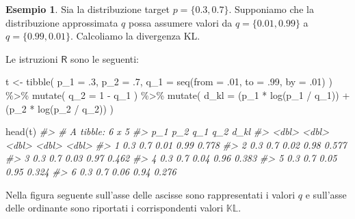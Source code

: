 \documentclass[
  11pt,
]{krantz}
\makeatletter
\newenvironment{Shaded}{\begin{snugshade}}{\end{snugshade}}
\newcommand{\AttributeTok}[1]{\textcolor[rgb]{0.61,0.61,0.61}{#1}}
\newcommand{\CommentTok}[1]{\textcolor[rgb]{0.37,0.37,0.37}{\textit{#1}}}
\newcommand{\DecValTok}[1]{\textcolor[rgb]{0.06,0.06,0.06}{#1}}
\newcommand{\FunctionTok}[1]{\textcolor[rgb]{0,0,0}{#1}}
\newcommand{\NormalTok}[1]{#1}
\newcommand{\OtherTok}[1]{\textcolor[rgb]{0.37,0.37,0.37}{#1}}
\newcommand{\SpecialCharTok}[1]{\textcolor[rgb]{0,0,0}{#1}}
\newenvironment{kframe}{%
\medskip{}
\setlength{\fboxsep}{.8em}
 \def\at@end@of@kframe{}%
 \ifinner\ifhmode%
  \def\at@end@of@kframe{\end{minipage}}%
  \begin{minipage}{\columnwidth}%
 \fi\fi%
 \def\FrameCommand##1{\hskip\@totalleftmargin \hskip-\fboxsep
 \colorbox{shadecolor}{##1}\hskip-\fboxsep
     \hskip-\linewidth \hskip-\@totalleftmargin \hskip\columnwidth}%
 \MakeFramed {\advance\hsize-\width
   \@totalleftmargin\z@ \linewidth\hsize
   \@setminipage}}%
 {\par\unskip\endMakeFramed%
 \at@end@of@kframe}
\renewenvironment{Shaded}{\begin{kframe}}{\end{kframe}}
\newcommand{\R}{\textsf{R}} %
\theoremstyle{definition}
\theoremstyle{definition}
\newtheorem{example}{Esempio}[chapter]
\theoremstyle{definition}
\theoremstyle{definition}
\theoremstyle{remark}
\makeatother
\begin{document}
\begin{example}
\citep[da][]{McElreath_rethinking} Sia la distribuzione target \(p = \{0.3, 0.7\}\). Supponiamo che la distribuzione approssimata \(q\) possa assumere valori da \(q = \{0.01, 0.99\}\) a \(q = \{0.99, 0.01\}\). Calcoliamo la divergenza KL.

Le istruzioni \(\R\) sono le seguenti:

\begin{Shaded}
\begin{Highlighting}[]
\NormalTok{t }\OtherTok{\textless{}{-}}
  \FunctionTok{tibble}\NormalTok{(}
    \AttributeTok{p\_1 =}\NormalTok{ .}\DecValTok{3}\NormalTok{,}
    \AttributeTok{p\_2 =}\NormalTok{ .}\DecValTok{7}\NormalTok{,}
    \AttributeTok{q\_1 =} \FunctionTok{seq}\NormalTok{(}\AttributeTok{from =}\NormalTok{ .}\DecValTok{01}\NormalTok{, }\AttributeTok{to =}\NormalTok{ .}\DecValTok{99}\NormalTok{, }\AttributeTok{by =}\NormalTok{ .}\DecValTok{01}\NormalTok{)}
\NormalTok{  ) }\SpecialCharTok{\%\textgreater{}\%}
  \FunctionTok{mutate}\NormalTok{(}
    \AttributeTok{q\_2 =} \DecValTok{1} \SpecialCharTok{{-}}\NormalTok{ q\_1}
\NormalTok{  ) }\SpecialCharTok{\%\textgreater{}\%}
  \FunctionTok{mutate}\NormalTok{(}
    \AttributeTok{d\_kl =}\NormalTok{ (p\_1 }\SpecialCharTok{*} \FunctionTok{log}\NormalTok{(p\_1 }\SpecialCharTok{/}\NormalTok{ q\_1)) }\SpecialCharTok{+}\NormalTok{ (p\_2 }\SpecialCharTok{*} \FunctionTok{log}\NormalTok{(p\_2 }\SpecialCharTok{/}\NormalTok{ q\_2))}
\NormalTok{  )}

\FunctionTok{head}\NormalTok{(t)}
\CommentTok{\#\textgreater{} \# A tibble: 6 x 5}
\CommentTok{\#\textgreater{}     p\_1   p\_2   q\_1   q\_2  d\_kl}
\CommentTok{\#\textgreater{}   \textless{}dbl\textgreater{} \textless{}dbl\textgreater{} \textless{}dbl\textgreater{} \textless{}dbl\textgreater{} \textless{}dbl\textgreater{}}
\CommentTok{\#\textgreater{} 1   0.3   0.7  0.01  0.99 0.778}
\CommentTok{\#\textgreater{} 2   0.3   0.7  0.02  0.98 0.577}
\CommentTok{\#\textgreater{} 3   0.3   0.7  0.03  0.97 0.462}
\CommentTok{\#\textgreater{} 4   0.3   0.7  0.04  0.96 0.383}
\CommentTok{\#\textgreater{} 5   0.3   0.7  0.05  0.95 0.324}
\CommentTok{\#\textgreater{} 6   0.3   0.7  0.06  0.94 0.276}
\end{Highlighting}
\end{Shaded}

\noindent Nella figura seguente sull'asse delle ascisse sono rappresentati i valori \(q\) e sull'asse delle ordinante sono riportati i corrispondenti valori \(\mathbb{KL}\).


\end{example}
\end{document}
